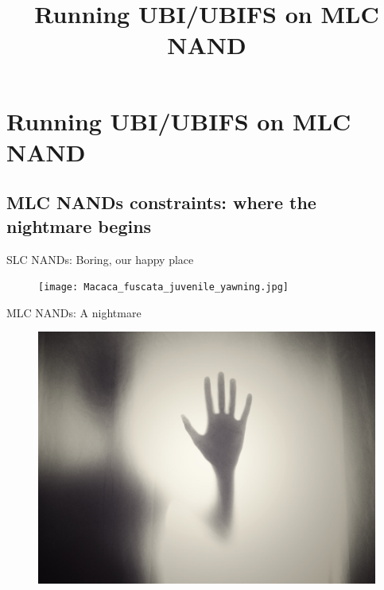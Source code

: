 \documentclass[aspectratio=169,obeyspaces,spaces,hyphens,dvipsnames]{beamer}
\title{Running UBI/UBIFS on MLC NAND}
\institute{Free Electrons, sigma star gmbh}
\begin{document}
\section{Running UBI/UBIFS on MLC NAND}

\subsection{MLC NANDs constraints: where the nightmare begins}

\begin{frame}{SLC NANDs: Boring, our happy place}
  \begin{figure}
  \texttt{[image: Macaca\_fuscata\_juvenile\_yawning.jpg]}
   \end{figure}
\end{frame}

\begin{frame}{MLC NANDs: A nightmare}
  \begin{figure}
  \includegraphics[scale=0.1]{hand-984170_1920.jpg}
   \end{figure}
\end{frame}
\end{document}
